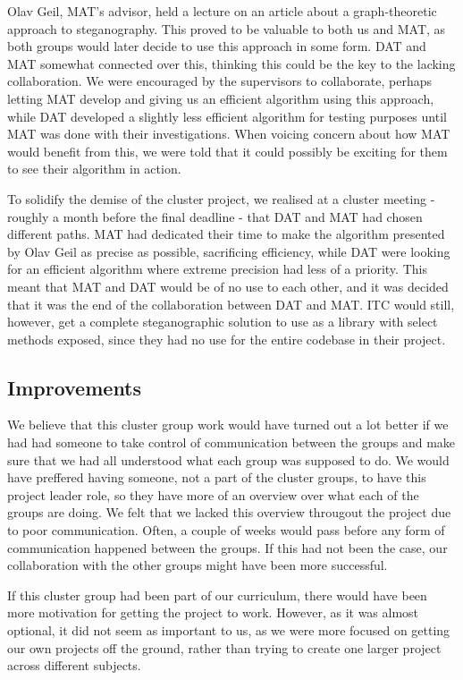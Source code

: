 Olav Geil, MAT's advisor, held a lecture on an article about a graph-theoretic approach to steganography.
This proved to be valuable to both us and MAT, as both groups would later decide to use this approach in some form.
DAT and MAT somewhat connected over this, thinking this could be the key to the lacking collaboration.
We were encouraged by the supervisors to collaborate, perhaps letting MAT develop and giving us an efficient algorithm using this approach, while DAT developed a slightly less efficient algorithm for testing purposes until MAT was done with their investigations.
When voicing concern about how MAT would benefit from this, we were told that it could possibly be exciting for them to see their algorithm in action.

To solidify the demise of the cluster project, we realised at a cluster meeting - roughly a month before the final deadline - that DAT and MAT had chosen different paths.
MAT had dedicated their time to make the algorithm presented by Olav Geil as precise as possible, sacrificing efficiency, while DAT were looking for an efficient algorithm where extreme precision had less of a priority.
This meant that MAT and DAT would be of no use to each other, and it was decided that it was the end of the collaboration between DAT and MAT.
ITC would still, however, get a complete steganographic solution to use as a library with select methods exposed, since they had no use for the entire codebase in their project.

\subsection*{Improvements}
We believe that this cluster group work would have turned out a lot better if we had had someone to take control of communication between the groups and make sure that we had all understood what each group was supposed to do. 
We would have preffered having someone, not a part of the cluster groups, to have this project leader role, so they have more of an overview over what each of the groups are doing.
We felt that we lacked this overview througout the project due to poor communication.
Often, a couple of weeks would pass before any form of communication happened between the groups. 
If this had not been the case, our collaboration with the other groups might have been more successful. 

If this cluster group had been part of our curriculum, there would have been more motivation for getting the project to work.
However, as it was almost optional, it did not seem as important to us, as we were more focused on getting our own projects off the ground, rather than trying to create one larger project across different subjects.
\vspace{12pt}

